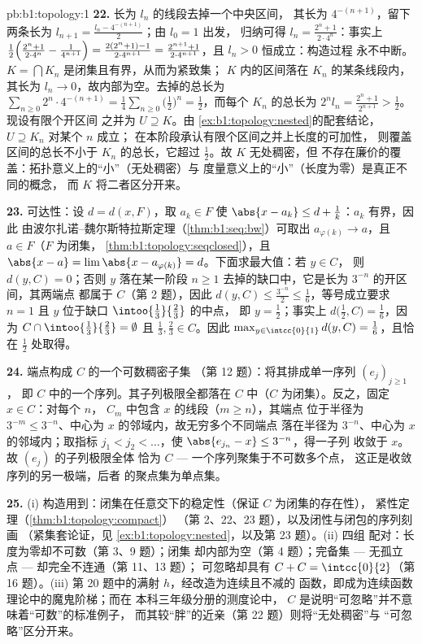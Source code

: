 \begin{solution}{pb:b1:topology:1}
\textbf{22.} 长为 $l_n$ 的线段去掉一个中央区间，
其长为 $4^{-(n+1)}$，留下两条长为 $l_{n+1}
= \frac{l_n - 4^{-(n+1)}}{2}$；由 $l_0 = 1$ 出发，
归纳可得 $l_n = \frac{2^n + 1}{2\cdot4^n}$：事实上
$\frac12\Bigl(\frac{2^n+1}{2\cdot4^n} - \frac{1}{4^{n+1}}\Bigr)
= \frac{2(2^n + 1) - 1}{2\cdot4^{n+1}} = \frac{2^{n+1} +
1}{2\cdot4^{n+1}}$，且 $l_n > 0$ 恒成立：构造过程
永不中断。$K = \bigcap K_n$ 是闭集且有界，从而为紧致集；
$K$ 内的区间落在 $K_n$ 的某条线段内，其长为
$l_n \to 0$，故内部为空。去掉的总长为 $\sum_{n\geq0} 2^n
\cdot 4^{-(n+1)} = \frac14\sum_{n\geq0}\bigl(\frac12\bigr)^n =
\frac12$，而每个 $K_n$ 的总长为 $2^n l_n = \frac{2^n +
1}{2^{n+1}} > \frac12$。现设有限个开区间
之并为 $U \supseteq K$。由
\cref{ex:b1:topology:nested}的配套结论，$U \supseteq K_n$ 对某个 $n$ 成立；
在本阶段承认有限个区间之并上长度的可加性，
则覆盖区间的总长不小于
$K_n$ 的总长，它超过 $\frac12$。故 $K$ 无处稠密，但
不存在廉价的覆盖：拓扑意义上的“小”（无处稠密）与
度量意义上的“小”（长度为零）是真正不同的概念，
而 $K$ 将二者区分开来。

\textbf{23.} 可达性：设 $d = d(x, F)$，取 $a_k \in F$
使 $\abs{x - a_k} \leq d + \frac1k$：$a_k$ 有界，因此
由波尔扎诺--魏尔斯特拉斯定理（\cref{thm:b1:seq:bw}）可取出
$a_{\varphi(k)} \to a$，且 $a \in F$（$F$ 为闭集，
\cref{thm:b1:topology:seqclosed}），且 $\abs{x - a} = \lim
\abs{x - a_{\varphi(k)}} = d$。下面求最大值：若 $y \in C$，
则 $d(y, C) = 0$；否则 $y$ 落在某一阶段
$n \geq 1$ 去掉的缺口中，它是长为 $3^{-n}$ 的开区间，其两端点
都属于 $C$（第 2 题），因此 $d(y, C) \leq
\frac{3^{-n}}{2} \leq \frac16$，等号成立要求 $n = 1$
且 $y$ 位于缺口 $\intoo{\frac13}{\frac23}$ 的中点，
即 $y = \frac12$；事实上 $d\bigl(\frac12, C\bigr) =
\frac16$，因为 $C \cap \intoo{\frac13}{\frac23} = \emptyset$ 且
$\frac13, \frac23 \in C$。因此 $\max_{y\in\intcc{0}{1}} d(y, C)
= \frac16$，且恰在 $\frac12$ 处取得。

\textbf{24.} 端点构成 $C$ 的一个可数稠密子集
（第 12 题）：将其排成单一序列 $(e_j)_{j\geq1}$，
即 $C$ 中的一个序列。其子列极限全都落在 $C$ 中（$C$
为闭集）。反之，固定 $x \in C$：对每个 $n$，
$C_m$ 中包含 $x$ 的线段（$m \geq n$），其端点
位于半径为 $3^{-m} \leq 3^{-n}$、中心为 $x$ 的邻域内，故无穷多个不同端点
落在半径为 $3^{-n}$、中心为 $x$ 的邻域内；取指标 $j_1 < j_2
< \dots$，使 $\abs{e_{j_n} - x} \leq 3^{-n}$，得一子列
收敛于 $x$。故 $(e_j)$ 的子列极限全体
恰为 $C$ --- 一个序列聚集于不可数多个点，
这正是收敛序列的另一极端，后者
的聚点集为单点集。

\textbf{25.} (i) 构造用到：闭集在任意交下的稳定性（保证
$C$ 为闭集的存在性），
紧性定理（\cref{thm:b1:topology:compact}）
（第 2、22、23 题），以及闭性与闭包的序列刻画
（紧集套论证，见
\cref{ex:b1:topology:nested}，以及第 23 题）。(ii) 四组
配对：长度为零却不可数（第 3、9 题）；闭集
却内部为空（第 4 题）；完备集 --- 无孤立
点 --- 却完全不连通（第 11、13 题）；
可忽略却具有 $C + C = \intcc{0}{2}$（第 16 题）。(iii)
第 20 题中的满射 $h$，经改造为连续且不减的
函数，即成为连续函数理论中的魔鬼阶梯；而在
本科三年级分册的测度论中，
$C$ 是说明“可忽略”并不意味着“可数”的标准例子，
而其较“胖”的近亲（第 22 题）则将“无处稠密”与
“可忽略”区分开来。
\end{solution}
